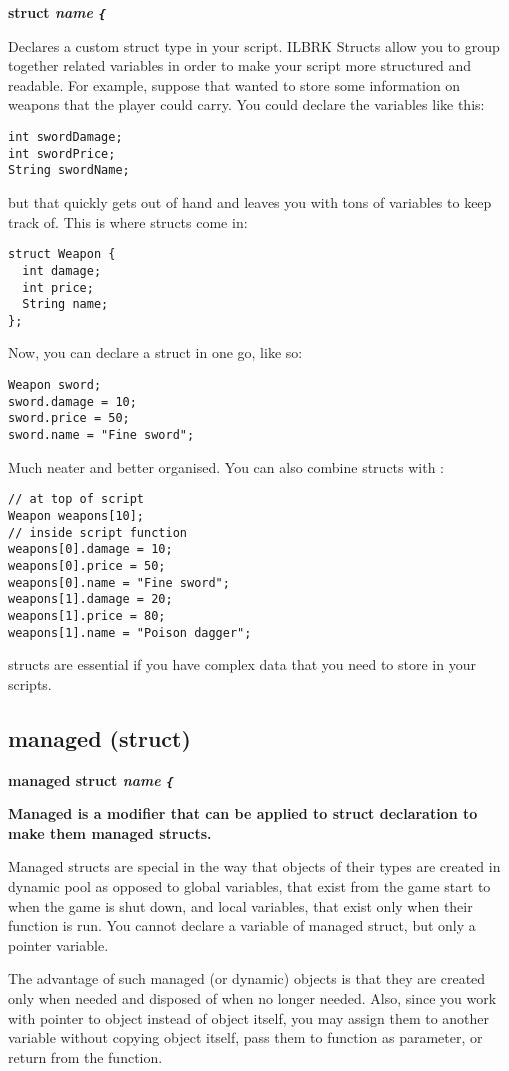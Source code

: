 \bf{struct} \it{name} \verb${$

Declares a custom struct type in your script. ILBRK
Structs allow you to group together related variables in order to make your
script more structured and readable. For example, suppose that wanted to store
some information on weapons that the player could carry. You could declare
the variables like this:
\begin{verbatim}
int swordDamage;
int swordPrice;
String swordName;
\end{verbatim}
but that quickly gets out of hand and leaves you with tons of variables to keep track of.
This is where structs come in:
\begin{verbatim}
struct Weapon {
  int damage;
  int price;
  String name;
};
\end{verbatim}
Now, you can declare a struct in one go, like so:
\begin{verbatim}
Weapon sword;
sword.damage = 10;
sword.price = 50;
sword.name = "Fine sword";
\end{verbatim}
Much neater and better organised. You can also combine structs with :
\begin{verbatim}
// at top of script
Weapon weapons[10];
// inside script function
weapons[0].damage = 10;
weapons[0].price = 50;
weapons[0].name = "Fine sword";
weapons[1].damage = 20;
weapons[1].price = 80;
weapons[1].name = "Poison dagger";
\end{verbatim}
structs are essential if you have complex data that you need to store in your scripts.


\subsection{managed (struct)}\label{managedmodifier}%

\bf{managed struct} \it{name} \verb${$

\bf{Managed} is a modifier that can be applied to \bf{struct} declaration to make them
managed structs.

Managed structs are special in the way that objects of their types are created in dynamic pool
as opposed to global variables, that exist from the game start to when the game is shut down,
and local variables, that exist only when their function is run. You cannot declare a variable
of managed struct, but only a pointer variable.

The advantage of such managed (or dynamic) objects is that they are created only when needed
and disposed of when no longer needed. Also, since you work with pointer to object instead of
object itself, you may assign them to another variable without copying object itself, pass them
to function as parameter, or return from the function.

